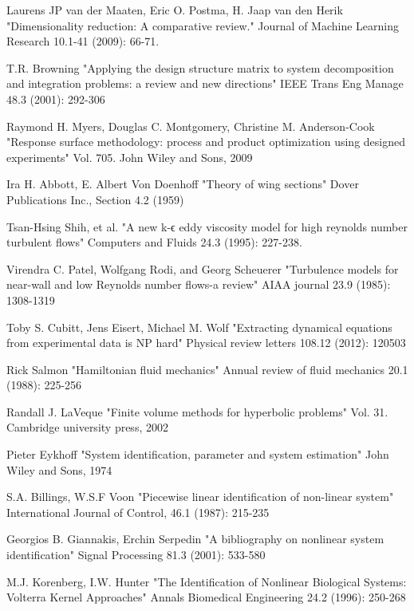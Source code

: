 \documentclass[a4paper,onecolumn]{article}
\theoremstyle{remark}
\begin{document}
\begin{thebibliography}{9}
Laurens JP van der Maaten, Eric O. Postma, H. Jaap van den Herik
"Dimensionality reduction: A comparative review." 
Journal of Machine Learning Research 10.1-41 (2009): 66-71.

T.R. Browning
"Applying the design structure matrix to system decomposition and integration problems: a review
 and new directions"
IEEE Trans Eng Manage 48.3 (2001): 292-306

Raymond H. Myers, Douglas C. Montgomery, Christine M. Anderson-Cook
"Response surface methodology: process and product optimization using designed experiments"
Vol. 705. John Wiley and Sons, 2009

Ira H. Abbott, E. Albert Von Doenhoff
"Theory of wing sections"
Dover Publications Inc., Section 4.2 (1959)

Tsan-Hsing Shih, et al. 
"A new k-ϵ eddy viscosity model for high reynolds number turbulent flows" 
Computers and Fluids 24.3 (1995): 227-238.

Virendra C. Patel, Wolfgang Rodi, and Georg Scheuerer
"Turbulence models for near-wall and low Reynolds number flows-a review"
AIAA journal 23.9 (1985): 1308-1319

Toby S. Cubitt, Jens Eisert, Michael M. Wolf
"Extracting dynamical equations from experimental data is NP hard"
Physical review letters 108.12 (2012): 120503

Rick Salmon 
"Hamiltonian fluid mechanics"
Annual review of fluid mechanics 20.1 (1988): 225-256

Randall J. LaVeque
"Finite volume methods for hyperbolic problems"
Vol. 31. Cambridge university press, 2002

Pieter Eykhoff
"System identification, parameter and system estimation"
John Wiley and Sons, 1974

S.A. Billings, W.S.F Voon
"Piecewise linear identification of non-linear system"
International Journal of Control, 46.1 (1987): 215-235

Georgios B. Giannakis, Erchin Serpedin
"A bibliography on nonlinear system identification"
Signal Processing 81.3 (2001): 533-580

M.J. Korenberg, I.W. Hunter
"The Identification of Nonlinear Biological Systems: Volterra Kernel Approaches"
Annals Biomedical Engineering 24.2 (1996): 250-268


\end{thebibliography}
\end{document}
